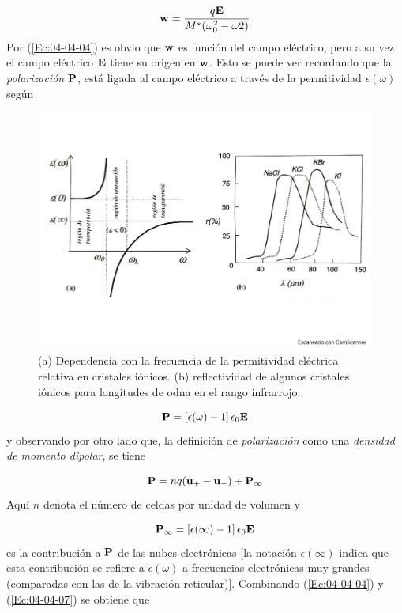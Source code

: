 \begin{equation}
	\mathbf{w} = \frac{q\mathbf{E}}{M^* (\omega_0^2 - \omega2)}\label{Ec:04-04-04}
\end{equation}
Por (\ref{Ec:04-04-04}) es obvio que $\mathbf{w}$ es función del campo eléctrico, pero a su vez el campo eléctrico $\mathbf{E}$ tiene su origen en $\mathbf{w}$. Esto se puede ver recordando que la \textit{polarización} $\mathbf{P}$, está ligada al campo eléctrico a través de la permitividad $\epsilon (\omega)$ según 

\begin{figure}[h!] \centering
	\includegraphics[scale=0.4]{Cuerpo/Ch_04/Fotos libro 8.pdf}
	\caption{(a) Dependencia con la frecuencia de la permitividad eléctrica relativa en cristales iónicos. (b) reflectividad de algunos cristales iónicos para longitudes de odna en el rango infrarrojo.}
	\label{Fig:04-08}
\end{figure}    


\begin{equation}
	\mathbf{P} = \left[ \epsilon (\omega) -1  \right] \epsilon_0  \mathbf{E}
\end{equation}
y observando por otro lado que, la definición de \textit{polarización} como una \textit{densidad de momento dipolar}, se tiene  

\begin{eqnarray}
	\mathbf{P} = n q (\mathbf{u}_+ - \mathbf{u}_-) + \mathbf{P}_\infty
\end{eqnarray}
Aquí $n$ denota el número de celdas por unidad de volumen y 

\begin{equation}
	\mathbf{P}_\infty = \left[ \epsilon (\infty) -1  \right] \epsilon_0 \mathbf{E}\label{Ec:04-04-07}
\end{equation}
es la contribución a $\mathbf{P}$ de las nubes electrónicas [la notación $\epsilon (\infty)$ indica que esta contribución se refiere a $\epsilon (\omega)$ a frecuencias electrónicas muy grandes (comparadas con las de la vibración reticular)]. Combinando (\ref{Ec:04-04-04}) y (\ref{Ec:04-04-07}) se obtiene que

